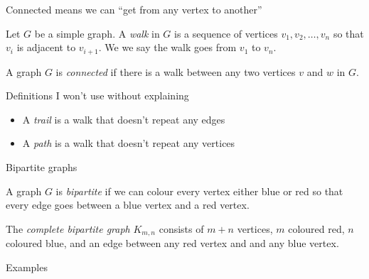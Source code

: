 \documentclass{beamer}
\begin{document}
\begin{frame}{Connected means we can ``get from any vertex to another''}
  \begin{definition}[Walk] Let $G$ be a simple graph.  A \emph{walk} in $G$ is a sequence of vertices $v_1, v_2, \dots, v_n$ so that $v_i$ is adjacent to $v_{i+1}$.  We we say the walk goes from $v_1$ to $v_n$.
    \end{definition}

  \begin{definition}[Connected] A graph $G$ is \emph{connected} if there is a walk between any two vertices $v$ and $w$ in $G$.
  \end{definition}

  \begin{block}{Definitions I won't use without explaining}
    \begin{itemize}
    \item A \emph{trail} is a walk that doesn't repeat any edges
    \item A \emph{path} is a walk that doesn't repeat any vertices
    \end{itemize}
    \end{block}

\end{frame}
  
\begin{frame}{Bipartite graphs}
  \begin{definition} A graph $G$ is \emph{bipartite} if we can colour every vertex either blue or red so that every edge goes between a blue vertex and a red vertex.
  \end{definition}
  \begin{definition} The \emph{complete bipartite graph} $K_{m,n}$ consists of $m+n$ vertices, $m$ coloured red, $n$ coloured blue, and an edge between any red vertex and and any blue vertex.
  \end{definition}

  \begin{block}{Examples}
    \end{block}
\end{frame}
\end{document}
